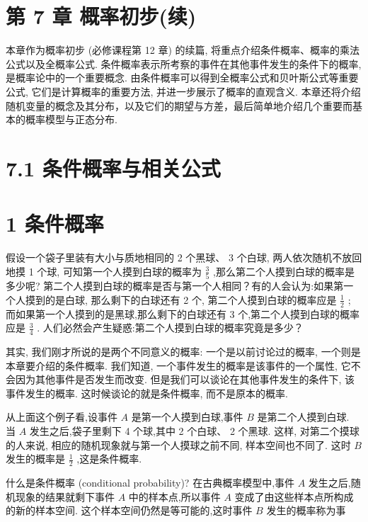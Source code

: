 \documentclass[10pt]{article}
\begin{document}
\section*{第 7 章 概率初步(续)}



本章作为概率初步 (必修课程第 12 章) 的续篇, 将重点介绍条件概率、概率的乘法公式以及全概率公式. 条件概率表示所考察的事件在其他事件发生的条件下的概率, 是概率论中的一个重要概念. 由条件概率可以得到全概率公式和贝叶斯公式等重要公式, 它们是计算概率的重要方法, 并进一步展示了概率的直观含义. 本章还将介绍随机变量的概念及其分布，以及它们的期望与方差，最后简单地介绍几个重要而基本的概率模型与正态分布.

\section*{7.1 条件概率与相关公式}

\section*{1 条件概率}

假设一个袋子里装有大小与质地相同的 2 个黑球、 3 个白球, 两人依次随机不放回地摸 1 个球, 可知第一个人摸到白球的概率为 \(\frac{3}{5}\) ,那么第二个人摸到白球的概率是多少呢? 第二个人摸到白球的概率是否与第一个人相同？有的人会认为:如果第一个人摸到的是白球, 那么剩下的白球还有 2 个, 第二个人摸到白球的概率应是 \(\frac{1}{2}\) ; 而如果第一个人摸到的是黑球,那么剩下的白球还有 3 个,第二个人摸到白球的概率应是 \(\frac{3}{4}\) . 人们必然会产生疑惑:第二个人摸到白球的概率究竟是多少？

其实, 我们刚才所说的是两个不同意义的概率: 一个是以前讨论过的概率, 一个则是本章要介绍的条件概率. 我们知道, 一个事件发生的概率是该事件的一个属性, 它不会因为其他事件是否发生而改变. 但是我们可以谈论在其他事件发生的条件下, 该事件发生的概率. 这时候谈论的就是条件概率, 而不是原本的概率.

从上面这个例子看,设事件 \(A\) 是第一个人摸到白球,事件 \(B\) 是第二个人摸到白球. 当 \(A\) 发生之后,袋子里剩下 4 个球,其中 2 个白球、 2 个黑球. 这样, 对第二个摸球的人来说, 相应的随机现象就与第一个人摸球之前不同, 样本空间也不同了. 这时 \(B\) 发生的概率是 \(\frac{1}{2}\) ,这是条件概率.

什么是条件概率 (conditional probability)? 在古典概率模型中,事件 \(A\) 发生之后,随机现象的结果就剩下事件 \(A\) 中的样本点,所以事件 \(A\) 变成了由这些样本点所构成的新的样本空间. 这个样本空间仍然是等可能的,这时事件 \(B\) 发生的概率称为事
\end{document}
